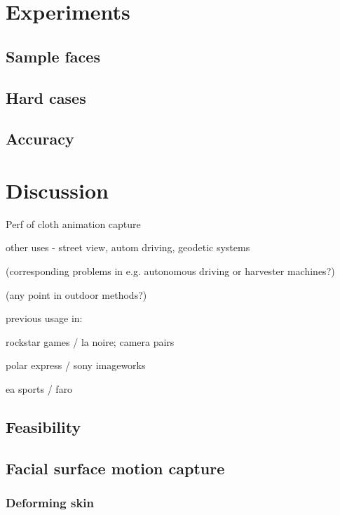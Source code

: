 \section{Experiments}


\subsection{Sample faces}

\subsection{Hard cases}


\subsection{Accuracy}

\section{Discussion}

Perf of cloth animation capture

other uses - street view, autom driving, geodetic systems

(corresponding problems in e.g. autonomous driving or harvester machines?)

(any point in outdoor methods?)


previous usage in:

	rockstar games / la noire; camera pairs

	polar express / sony imageworks

	ea sports / faro



\subsection{Feasibility}

\subsection{Facial surface motion capture} %

\subsubsection{Deforming skin}

